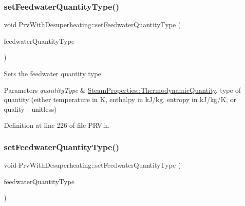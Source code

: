 \subsubsection{\texorpdfstring{set\+Feedwater\+Quantity\+Type()}{setFeedwaterQuantityType()}\hspace{0.1cm}{\footnotesize\ttfamily [2/3]}}
{\footnotesize\ttfamily void Prv\+With\+Desuperheating\+::set\+Feedwater\+Quantity\+Type (\begin{DoxyParamCaption}\item[{\hyperlink{class_steam_properties_ae0294bedf7d178c2d8fb6aed0f62fbff}{Steam\+Properties\+::\+Thermodynamic\+Quantity}}]{feedwater\+Quantity\+Type }\end{DoxyParamCaption})\hspace{0.3cm}{\ttfamily [inline]}}

Sets the feedwater quantity type


\begin{DoxyParams}{Parameters}
{\em quantity\+Type} & \hyperlink{class_steam_properties_ae0294bedf7d178c2d8fb6aed0f62fbff}{Steam\+Properties\+::\+Thermodynamic\+Quantity}, type of quantity (either temperature in K, enthalpy in k\+J/kg, entropy in k\+J/kg/K, or quality -\/ unitless) \\
\hline
\end{DoxyParams}


Definition at line 226 of file P\+R\+V.\+h.

\mbox{\label{class_prv_with_desuperheating_a3efaf028d1e6b8349a9e064605cc8d7a}} 
\subsubsection{\texorpdfstring{set\+Feedwater\+Quantity\+Type()}{setFeedwaterQuantityType()}\hspace{0.1cm}{\footnotesize\ttfamily [3/3]}}
{\footnotesize\ttfamily void Prv\+With\+Desuperheating\+::set\+Feedwater\+Quantity\+Type (\begin{DoxyParamCaption}\item[{\hyperlink{class_steam_properties_ae0294bedf7d178c2d8fb6aed0f62fbff}{Steam\+Properties\+::\+Thermodynamic\+Quantity}}]{feedwater\+Quantity\+Type }\end{DoxyParamCaption})\hspace{0.3cm}{\ttfamily [inline]}}

